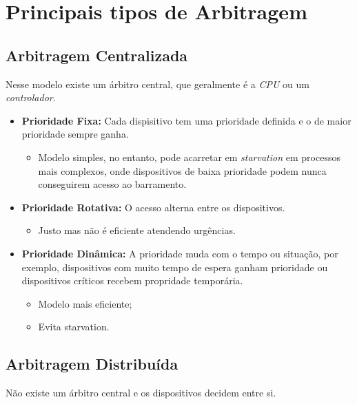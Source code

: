 \documentclass{article}
\begin{document}
\section{Principais tipos de Arbitragem}

\subsection{Arbitragem Centralizada}
Nesse modelo existe um árbitro central, que geralmente é a \emph{CPU} ou um \emph{controlador}.
\begin{itemize}
    \item \textbf{Prioridade Fixa:} Cada dispisitivo tem uma prioridade definida e o de maior prioridade sempre ganha.
        \begin{itemize}
            \item Modelo simples, no entanto, pode acarretar em \textit{starvation} em processos mais complexos, onde dispositivos de baixa prioridade podem nunca conseguirem acesso ao barramento.
        \end{itemize}

    \item \textbf{Prioridade Rotativa:} O acesso alterna entre os dispositivos.
        \begin{itemize}
            \item Justo mas não é eficiente atendendo urgências.
        \end{itemize}

    \item \textbf{Prioridade Dinâmica:} A prioridade muda com o tempo ou situação, por exemplo, dispositivos com muito tempo de espera ganham prioridade ou dispositivos críticos recebem propridade temporária.
        \begin{itemize}
            \item Modelo mais eficiente;
            \item Evita starvation.
        \end{itemize}
\end{itemize}

\subsection{Arbitragem Distribuída}
Não existe um árbitro central e os dispositivos decidem entre si.
\end{document}
